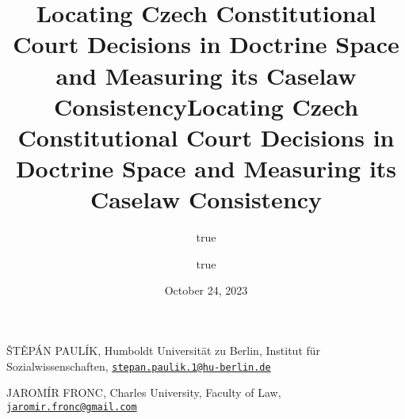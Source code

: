 \documentclass[
  11pt,
]{article}
\title{Locating Czech Constitutional Court Decisions in Doctrine Space
and Measuring its Caselaw Consistency}
\author{true \and true}
\date{October 24, 2023}
\title{Locating Czech Constitutional Court Decisions in Doctrine Space
and Measuring its Caselaw Consistency }
\date{}
\begin{document}



{%
\setlength{\parindent}{0pt}
\thispagestyle{plain}
{%
\maketitle  %

}




{
   \vskip 13.5pt\relax \normalsize\fontsize{11}{12}
   \MakeUppercase{Štěpán Paulík}, \small{Humboldt Universität zu Berlin,
Institut für Sozialwissenschaften,
\href{mailto:stepan.paulik.1@hu-berlin.de}{\nolinkurl{stepan.paulik.1@hu-berlin.de}}}   \par \vskip -3.5pt \MakeUppercase{Jaromír
Fronc}, \small{Charles University, Faculty of Law,
\href{mailto:jaromir.fronc@gmail.com}{\nolinkurl{jaromir.fronc@gmail.com}}}   

}

}
\end{document}
